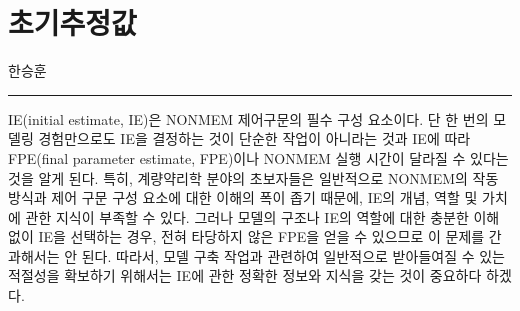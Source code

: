 \documentclass[
  11pt,
  krantz2,
  a4paper]{krantz}
\newenvironment{Shaded}{\begin{snugshade}}{\end{snugshade}}
\newcommand{\DecValTok}[1]{\textcolor[rgb]{0.00,0.00,0.81}{#1}}
\newcommand{\ErrorTok}[1]{\textcolor[rgb]{0.64,0.00,0.00}{\textbf{#1}}}
\newcommand{\KeywordTok}[1]{\textcolor[rgb]{0.13,0.29,0.53}{\textbf{#1}}}
\newcommand{\NormalTok}[1]{#1}
\newcommand{\OperatorTok}[1]{\textcolor[rgb]{0.81,0.36,0.00}{\textbf{#1}}}
\newcommand{\StringTok}[1]{\textcolor[rgb]{0.31,0.60,0.02}{#1}}
\theoremstyle{definition}
\theoremstyle{definition}
\theoremstyle{definition}
\theoremstyle{remark}
\begin{document}
\begin{Shaded}
\end{Shaded}

\hypertarget{IE}{%
\chapter{초기추정값}\label{IE}}

\Large\hfill

한승훈
\normalsize

\begin{center}\rule{0.5\linewidth}{0.5pt}\end{center}

IE(initial estimate, IE)은 NONMEM 제어구문의 필수 구성 요소이다. 단 한 번의 모델링 경험만으로도 IE을 결정하는 것이 단순한 작업이 아니라는 것과 IE에 따라 FPE(final parameter estimate, FPE)이나 NONMEM 실행 시간이 달라질 수 있다는 것을 알게 된다. 특히, 계량약리학 분야의 초보자들은 일반적으로 NONMEM의 작동 방식과 제어 구문 구성 요소에 대한 이해의 폭이 좁기 때문에, IE의 개념, 역할 및 가치에 관한 지식이 부족할 수 있다. 그러나 모델의 구조나 IE의 역할에 대한 충분한 이해 없이 IE을 선택하는 경우, 전혀 타당하지 않은 FPE을 얻을 수 있으므로 이 문제를 간과해서는 안 된다. 따라서, 모델 구축 작업과 관련하여 일반적으로 받아들여질 수 있는 적절성을 확보하기 위해서는 IE에 관한 정확한 정보와 지식을 갖는 것이 중요하다 하겠다.
\end{document}
